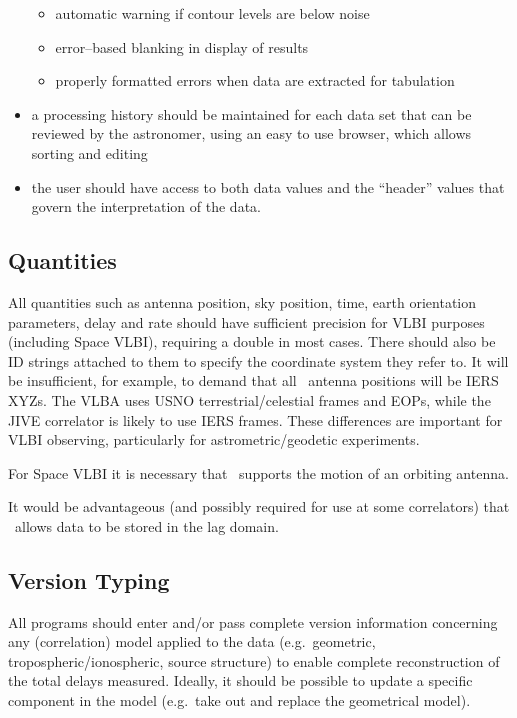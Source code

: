 \begin{itemize}
\begin{itemize}
  \item automatic warning if contour levels are below noise

  \item error--based blanking in display of results

  \item properly formatted errors when data are extracted for tabulation

  \end{itemize}
  
\item a processing history should be maintained for each data set that
  can be reviewed by the astronomer, using an easy to use
  browser, which allows sorting and editing
    
\item the user should have access to both data values and the
    ``header'' values that govern the interpretation of the data.

\end{itemize}

\subsection{Quantities}

All quantities such as antenna position, sky position, time, earth
orientation parameters, delay and rate should have sufficient
precision for VLBI purposes (including Space VLBI), requiring a double
in most cases.  There should also be ID strings attached to them to
specify the coordinate system they refer to. It will be insufficient,
for example, to demand that all \aipspp\ antenna positions will be
IERS XYZs. The VLBA uses USNO terrestrial\slash celestial frames and EOPs,
while the JIVE correlator is likely to use IERS frames. These
differences are important for VLBI observing, particularly for
astrometric\slash geodetic experiments.

For Space VLBI it is necessary that \aipspp\ supports the motion of an
orbiting antenna.

It would be advantageous (and possibly required for use at some
correlators) that \aipspp\ allows data to be stored in the lag domain.

\subsection{Version Typing}

All programs should enter and\slash or pass complete version information
concerning any (correlation) model applied to the data (e.g.\ 
geometric, tropospheric\slash ionospheric, source structure) to enable
complete reconstruction of the total delays measured. Ideally, it
should be possible to update a specific component in the model (e.g.\ 
take out and replace the geometrical model).

